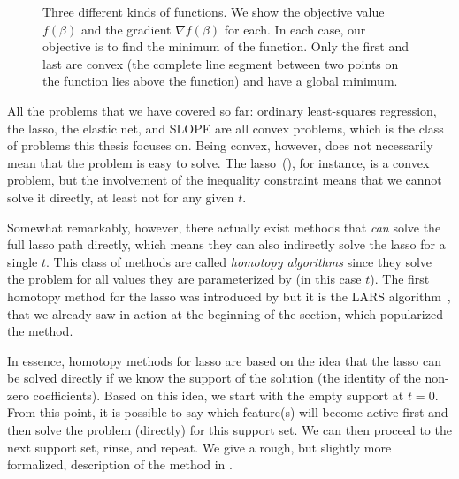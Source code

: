 \begin{figure}
  \caption{%
    Three different kinds of functions. We show the objective value \(f(\beta)\) and the gradient \(\nabla f(\beta)\) for each. In each case, our objective is to find the minimum of the function. Only the first and last are convex (the complete line segment between two points on the function lies above the function) and have a global minimum.
  }
  \label{fig:1d-convexity}
\end{figure}

All the problems that we have covered so far: ordinary least-squares regression, the lasso, the elastic net, and SLOPE are all convex problems, which is the class of problems this thesis focuses on. Being convex, however, does not necessarily mean that the problem is easy to solve. The lasso~(), for instance, is a convex problem, but the involvement of the inequality constraint means that we cannot solve it directly, at least not for any given \(t\).

Somewhat remarkably, however, there actually exist methods that \emph{can} solve the full lasso path directly, which means they can also indirectly solve the lasso for a single \(t\). This class of methods are called \emph{homotopy algorithms} since they solve the problem for all values they are parameterized by (in this case \(t\)). The first homotopy method for the lasso was introduced by \textcite{osborne2000a} but it is the LARS algorithm~\parencite{efron2004}, that we already saw in action at the beginning of the section, which popularized the method.

In essence, homotopy methods for lasso are based on the idea that the lasso can be solved directly if we know the support of the solution (the identity of the non-zero coefficients). Based on this idea, we start with the empty support at \(t=0\). From this point, it is possible to say which feature(s) will become active first and then solve the problem (directly) for this support set. We can then proceed to the next support set, rinse, and repeat. We give a rough, but slightly more formalized, description of the method in .

